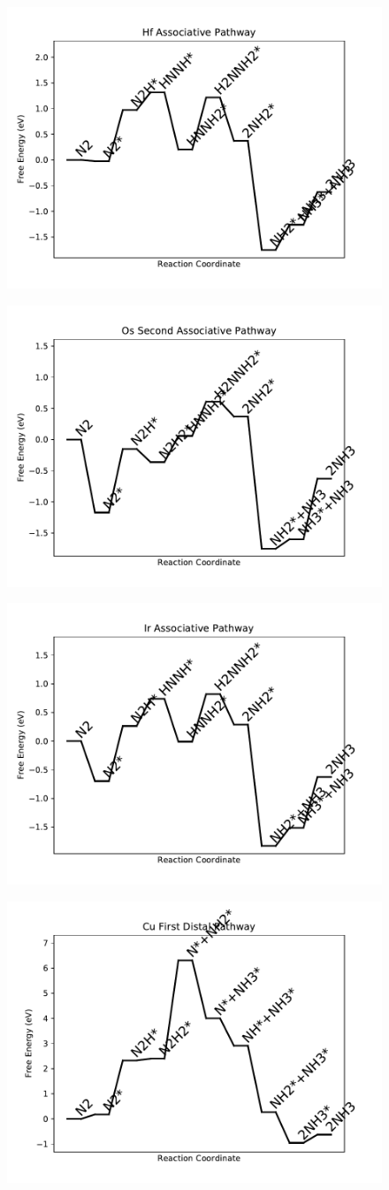 \documentclass[journal=jacsat,manuscript=article]{achemso}
\begin{document}
\begin{figure}
\includegraphics[width=0.5\linewidth]{data/plots/Hf_associative.pdf}
\label{fig:Hf_associative}
\end{figure}

\begin{figure}
\includegraphics[width=0.5\linewidth]{data/plots/Os_associative_2.pdf}
\label{fig:Os_associative_2}
\end{figure}

\begin{figure}
\includegraphics[width=0.5\linewidth]{data/plots/Ir_associative.pdf}
\label{fig:Ir_associative}
\end{figure}

\begin{figure}
\includegraphics[width=0.5\linewidth]{data/plots/Cu_distal_1.pdf}
\label{fig:Cu_distal_1}
\end{figure}
\end{document}

